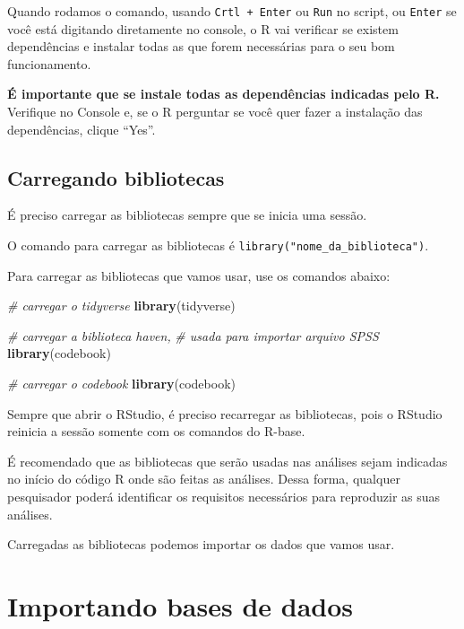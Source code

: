 \documentclass[
  10pt,
  brazil,
  a4paper,
  twoside, notitlepage, openright]{book}
\newenvironment{Shaded}{\begin{snugshade}}{\end{snugshade}}
\newcommand{\CommentTok}[1]{\textcolor[rgb]{0.56,0.35,0.01}{\textit{#1}}}
\newcommand{\KeywordTok}[1]{\textcolor[rgb]{0.13,0.29,0.53}{\textbf{#1}}}
\newcommand{\NormalTok}[1]{#1}
\begin{document}
Quando rodamos o comando, usando \texttt{Crtl\ +\ Enter} ou \texttt{Run} no script, ou \texttt{Enter} se você está digitando diretamente no console, o R vai verificar se existem dependências e instalar todas as que forem necessárias para o seu bom funcionamento.

\textbf{É importante que se instale todas as dependências indicadas pelo R.} Verifique no Console e, se o R perguntar se você quer fazer a instalação das dependências, clique ``Yes''.

\hypertarget{carregando-bibliotecas}{%
\section{Carregando bibliotecas}\label{carregando-bibliotecas}}

É preciso carregar as bibliotecas sempre que se inicia uma sessão.

O comando para carregar as bibliotecas é \texttt{library("nome\_da\_biblioteca")}.

Para carregar as bibliotecas que vamos usar, use os comandos abaixo:

\begin{Shaded}
\begin{Highlighting}[]
\CommentTok{# carregar o tidyverse}
\KeywordTok{library}\NormalTok{(tidyverse)}

\CommentTok{# carregar a biblioteca haven, }
\CommentTok{# usada para importar arquivo SPSS }
\KeywordTok{library}\NormalTok{(codebook)}

\CommentTok{# carregar o codebook}
\KeywordTok{library}\NormalTok{(codebook)}
\end{Highlighting}
\end{Shaded}

Sempre que abrir o RStudio, é preciso recarregar as bibliotecas, pois o RStudio reinicia a sessão somente com os comandos do R-base.

É recomendado que as bibliotecas que serão usadas nas análises sejam indicadas no início do código R onde são feitas as análises. Dessa forma, qualquer pesquisador poderá identificar os requisitos necessários para reproduzir as suas análises.

Carregadas as bibliotecas podemos importar os dados que vamos usar.

\hypertarget{importando-bases-de-dados}{%
\chapter{Importando bases de dados}\label{importando-bases-de-dados}}
\end{document}
